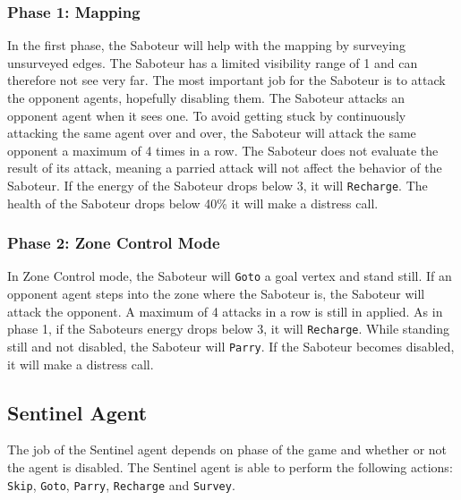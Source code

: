 \documentclass[11pt]{article}
\begin{document}
\subsubsection*{Phase 1: Mapping}
In the first phase, the Saboteur will help with the mapping by surveying unsurveyed edges. The Saboteur has a limited visibility range of 1 and can therefore not see very far. The most important job for the Saboteur is to attack the opponent agents, hopefully disabling them. The Saboteur attacks an opponent agent when it sees one. To avoid getting stuck by continuously attacking the same agent over and over, the Saboteur will attack the same opponent a maximum of 4 times in a row. The Saboteur does not evaluate the result of its attack, meaning a parried attack will not affect the behavior of the Saboteur. If the energy of the Saboteur drops below 3, it will {\tt Recharge}. The health of the Saboteur drops below 40\% it will make a distress call.

\subsubsection*{Phase 2: Zone Control Mode}
In Zone Control mode, the Saboteur will {\tt Goto} a goal vertex and stand still. If an opponent agent steps into the zone where the Saboteur is, the Saboteur will attack the opponent. A maximum of 4 attacks in a row is still in applied. As in phase 1, if the Saboteurs energy drops below 3, it will {\tt Recharge}. While standing still and not disabled, the Saboteur will {\tt Parry}. If the Saboteur becomes disabled, it will make a distress call.

\subsection{Sentinel Agent}
The job of the Sentinel agent depends on phase of the game and whether or not the agent is disabled. The Sentinel agent is able to perform the following actions: {\tt Skip}, {\tt Goto}, {\tt Parry}, {\tt Recharge} and {\tt Survey}.
\end{document}
